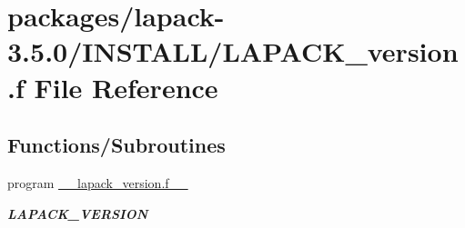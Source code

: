 \hypertarget{LAPACK__version_8f}{}\section{packages/lapack-\/3.5.0/\+I\+N\+S\+T\+A\+L\+L/\+L\+A\+P\+A\+C\+K\+\_\+version.f File Reference}
\label{LAPACK__version_8f}
\subsection*{Functions/\+Subroutines}
\begin{DoxyCompactItemize}
\item 
program \hyperlink{group__auxOTHERauxiliary_gab9662e1df88fb8f65d7f42edcc6f4dda}{\+\_\+\+\_\+lapack\+\_\+version.\+f\+\_\+\+\_\+}
\begin{DoxyCompactList}\small\item\em {\bfseries L\+A\+P\+A\+C\+K\+\_\+\+V\+E\+R\+S\+I\+O\+N} \end{DoxyCompactList}\end{DoxyCompactItemize}
